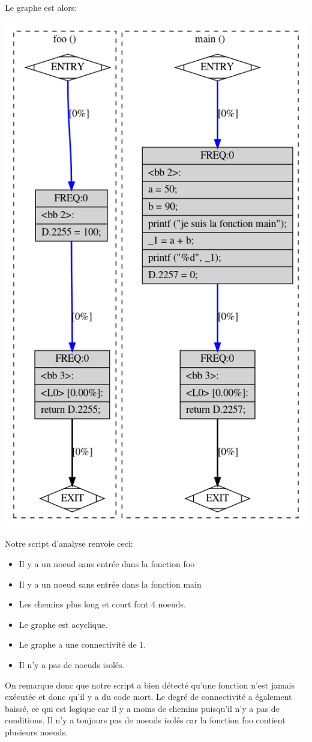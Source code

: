 Le graphe est alors:
\begin{center}
    \includegraphics[scale=0.35]{images/fonction_inutile.png}
\end{center}

Notre script d'analyse renvoie ceci:
\begin{itemize}
    \item Il y a un noeud sans entrée dans la fonction foo
    \item Il y a un noeud sans entrée dans la fonction main
    \item Les chemins plus long et court font 4 noeuds.
    \item Le graphe est acyclique.
    \item Le graphe a une connectivité de 1.
    \item Il n'y a pas de noeuds isolés.
\end{itemize}
On remarque donc que notre script a bien détecté qu'une fonction n'est jamais exécutée et donc qu'il y a du code mort. Le degré de connectivité a également baissé, ce qui est logique car il y a moins de chemins puisqu'il n'y a pas de conditions. Il n'y a toujours pas de noeuds isolés car la fonction foo contient plusieurs noeuds.